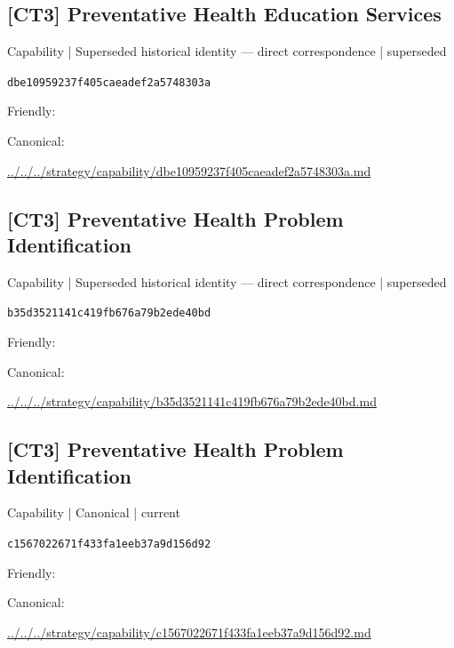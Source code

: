 \documentclass[10pt,a4paper]{article}
\begin{document}
\subsection*{[CT3] Preventative Health Education Services}
{\small Capability | Superseded historical identity — direct correspondence | superseded}\par
\texttt{dbe10959237f405caeadef2a5748303a}\par
Friendly: \par
Canonical: \par
{\footnotesize\url{../../../strategy/capability/dbe10959237f405caeadef2a5748303a.md}}\par
\subsection*{[CT3] Preventative Health Problem Identification}
{\small Capability | Superseded historical identity — direct correspondence | superseded}\par
\texttt{b35d3521141c419fb676a79b2ede40bd}\par
Friendly: \par
Canonical: \par
{\footnotesize\url{../../../strategy/capability/b35d3521141c419fb676a79b2ede40bd.md}}\par
\subsection*{[CT3] Preventative Health Problem Identification}
{\small Capability | Canonical | current}\par
\texttt{c1567022671f433fa1eeb37a9d156d92}\par
Friendly: \par
Canonical: \par
{\footnotesize\url{../../../strategy/capability/c1567022671f433fa1eeb37a9d156d92.md}}\par
\end{document}

